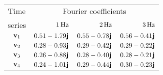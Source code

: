 \begin{tabular}{crrr}
    \toprule
    Time    & \multicolumn{3}{c}{Fourier coefficients} \\
    series  & $\unit[1]{Hz}$ & $\unit[2]{Hz}$ & $\unit[3]{Hz}$ \\\otoprule
    $\textbf{v}_{1}$ & $0.51-1.79\textbf{j}$ & $0.55-0.78\textbf{j}$ & $0.56-0.41\textbf{j}$ \\
    $\textbf{v}_{2}$ & $0.28-0.93\textbf{j}$ & $0.29-0.42\textbf{j}$ & $0.29-0.22\textbf{j}$ \\
    $\textbf{v}_{3}$ & $0.26-0.88\textbf{j}$ & $0.28-0.40\textbf{j}$ & $0.28-0.21\textbf{j}$ \\
    $\textbf{v}_{4}$ & $0.24-1.01\textbf{j}$ & $0.29-0.44\textbf{j}$ & $0.30-0.23\textbf{j}$ \\
    \bottomrule
\end{tabular}
